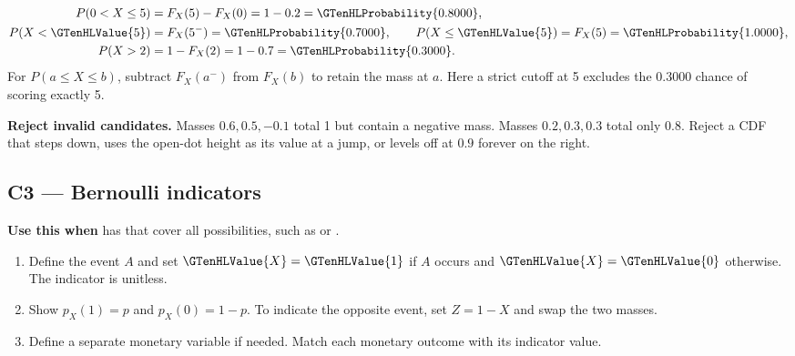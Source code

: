 \[
\begin{aligned}
P(0<X\leq5)&=F_X(5)-F_X(0)=1-0.2=\GTenHLProbability{0.8000},\\
P(X<\GTenHLValue{5})&=F_X(5^-)=\GTenHLProbability{0.7000},\qquad P(X\leq\GTenHLValue{5})=F_X(5)=\GTenHLProbability{1.0000},\\
P(X>2)&=1-F_X(2)=1-0.7=\GTenHLProbability{0.3000}.
\end{aligned}
\]
For \(P(a\leq X\leq b)\), subtract \(F_X(a^-)\) from \(F_X(b)\) to retain the mass at \(a\). Here a strict cutoff at 5 excludes the \(0.3000\) chance of scoring exactly 5.

\textbf{Reject invalid candidates.} Masses \(0.6,0.5,-0.1\) total 1 but contain a negative mass. Masses \(0.2,0.3,0.3\) total only \(0.8\). Reject a CDF that steps down, uses the open-dot height as its value at a jump, or levels off at \(0.9\) forever on the right.
\par\nobreak
{}

\newpage
\subsection{C3 --- Bernoulli indicators}\label{crit:C3}
\textbf{Use this when}  has  that cover all possibilities, such as  or .

\begin{enumerate}
\item Define the event \(A\) and set \(\GTenHLValue{X}=\GTenHLValue{1}\) if \(A\) occurs and \(\GTenHLValue{X}=\GTenHLValue{0}\) otherwise. The indicator is unitless.
\item Show \(p_X(1)=p\) and \(p_X(0)=1-p\). To indicate the opposite event, set \(Z=1-X\) and swap the two masses.
\item Define a separate monetary variable if needed. Match each monetary outcome with its indicator value.
\end{enumerate}

